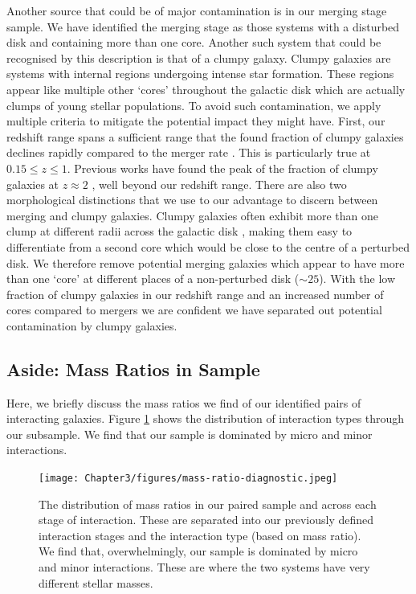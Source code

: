 Another source that could be of major contamination is in our merging stage sample. We have identified the merging stage as those systems with a disturbed disk and containing more than one core. Another such system that could be recognised by this description is that of a clumpy galaxy. Clumpy galaxies are systems with internal regions undergoing intense star formation. These regions appear like multiple other `cores' throughout the galactic disk which are actually clumps of young stellar populations. To avoid such contamination, we apply multiple criteria to mitigate the potential impact they might have. First, our redshift range spans a sufficient range that the found fraction of clumpy galaxies declines rapidly compared to the merger rate \citep{2022ApJ...931...16A}. This is particularly true at $0.15 \leq z \leq 1$. Previous works have found the peak of the fraction of clumpy galaxies at $z\approx2$ \citep{2014ApJ...786...15M, 2018ApJ...853..108G}, well beyond our redshift range. There are also two morphological distinctions that we use to our advantage to discern between merging and clumpy galaxies. Clumpy galaxies often exhibit more than one clump at different radii across the galactic disk \citep[with][finding a mean of 3.16 clumps per galaxy]{2022ApJ...931...16A}, making them easy to differentiate from a second core which would be close to the centre of a perturbed disk. We therefore remove potential merging galaxies which appear to have more than one `core' at different places of a non-perturbed disk ($\sim25$). With the low fraction of clumpy galaxies in our redshift range and an increased number of cores compared to mergers we are confident we have separated out potential contamination by clumpy galaxies.

\subsection{Aside: Mass Ratios in Sample}
Here, we briefly discuss the mass ratios we find of our identified pairs of interacting galaxies. Figure \ref{fig:mass-ratio} shows the distribution of interaction types through our subsample. We find that our sample is dominated by micro and minor interactions.

\begin{figure}
\centering
\texttt{[image: Chapter3/figures/mass-ratio-diagnostic.jpeg]}
\caption[The distribution of mass ratios in our paired sample and across each stage of interaction.]{The distribution of mass ratios in our paired sample and across each stage of interaction. These are separated into our previously defined interaction stages and the interaction type (based on mass ratio). We find that, overwhelmingly, our sample is dominated by micro and minor interactions. These are where the two systems have very different stellar masses.}
\label{fig:mass-ratio}
\end{figure}

